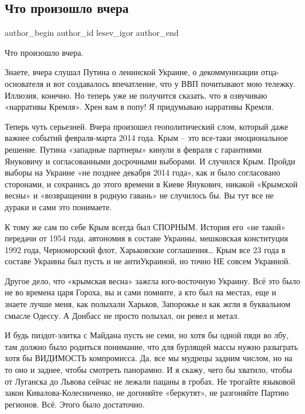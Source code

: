  
 
 
 
 
 
\subsection{Что произошло вчера}
\label{sec:22_02_2022.tg.lesev_igor.1.chto_proizoshlo_vchera}
 
\ifcmt
 author_begin
   author_id lesev_igor
 author_end
\fi

Что произошло вчера.

Знаете, вчера слушал Путина о ленинской Украине, о декоммунизации
отца-основателя и вот создавалось впечатление, что у ВВП почитывают мою
тележку. Иллюзия, конечно. Но теперь уже не получится сказать, что я озвучиваю
«нарративы Кремля». Хрен вам в попу! Я придумываю нарративы Кремля.

Теперь чуть серьезней. Вчера произошел геополитический слом, который даже
важнее событий февраля-марта 2014 года. Крым – это все-таки эмоциональное
решение. Путина «западные партнеры» кинули в февраля с гарантиями Януковичу и
согласованными досрочными выборами. И случился Крым. Пройди выборы на Украине
«не позднее декабря 2014 года», как и было согласовано сторонами, и сохранись
до этого времени в Киеве Янукович, никакой «Крымской весны» и «возвращении в
родную гавань» не случилось бы. Вы тут все не дураки и сами это понимаете.

К тому же сам по себе Крым всегда был СПОРНЫМ. История его «не такой» передачи
от 1954 года, автономия в составе Украины, мешковская конституция 1992 года,
Черноморский флот, Харьковские соглашения… Крым все 23 года в составе Украины
был пусть и не антиУкраиной, но точно НЕ совсем Украиной.

Другое дело, что «крымская весна» зажгла юго-восточную Украину. Всё это было не
во времена царя Гороха, вы и сами помните, а кто был на местах, еще и знаете
лучше меня, как полыхали Харьков, Запорожье и как жгли в буквальном смысле
Одессу. А Донбасс не просто полыхал, он ревел и метал.

И будь пиздот-элитка с Майдана пусть не семи, но хотя бы одной пяди во лбу, там
должно было родиться понимание, что для бурлящей массы нужно разыграть хотя бы
ВИДИМОСТЬ компромисса. Да, все мы мудрецы задним числом, но на то оно и заднее,
чтобы смотреть панорамно. И я скажу, чего бы хватило, чтобы от Луганска до
Львова сейчас не лежали пацаны в гробах. Не трогайте языковой закон
Кивалова-Колесниченко, не догоняйте «беркутят», не разгоняйте Партию регионов.
Всё. Этого было достаточно.

